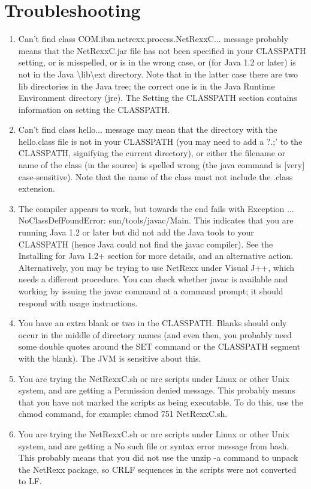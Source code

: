 \chapter{Troubleshooting}
\begin{enumerate} 
\item Can't find class COM.ibm.netrexx.process.NetRexxC... message
  probably means that the NetRexxC.jar file has not been specified in
  your CLASSPATH setting, or is misspelled, or is in the wrong case,
  or (for Java 1.2 or later) is not in the Java
  \textbackslash lib\textbackslash ext directory. Note that in the latter case there are two lib directories in the Java tree; the correct one is in the Java Runtime Environment directory (jre).
The Setting the CLASSPATH section contains information on setting the CLASSPATH.
\item Can't find class hello... message may mean that the directory with the hello.class file is not in your CLASSPATH (you may need to add a ?.;’ to the CLASSPATH, signifying the current directory), or either the filename or name of the class (in the source) is spelled wrong (the java command is [very] case-sensitive). Note that the name of the class must not include the .class extension.
\item The compiler appears to work, but towards the end fails with Exception ... NoClassDefFoundError: sun/tools/javac/Main. This indicates that you are running Java 1.2 or later but did not add the Java tools to your CLASSPATH (hence Java could not find the javac compiler). See the Installing for Java 1.2+ section for more details, and an alternative action.
Alternatively, you may be trying to use NetRexx under Visual J++, which needs a different procedure. You can check whether javac is available and working by issuing the javac command at a command prompt; it should respond with usage instructions.
\item You have an extra blank or two in the CLASSPATH. Blanks should only occur in the middle of directory names (and even then, you probably need some double quotes around the SET command or the CLASSPATH segment with the blank). The JVM is sensitive about this.
\item You are trying the NetRexxC.sh or nrc scripts under Linux or other Unix system, and are getting a Permission denied message. This probably means that you have not marked the scripts as being executable. To do this, use the chmod command, for example: chmod 751 NetRexxC.sh.
\item You are trying the NetRexxC.sh or nrc scripts under Linux or other Unix system, and are getting a No such file or syntax error message from bash. This probably means that you did not use the unzip -a command to unpack the NetRexx package, so CRLF sequences in the scripts were not converted to LF.

\end{enumerate}
